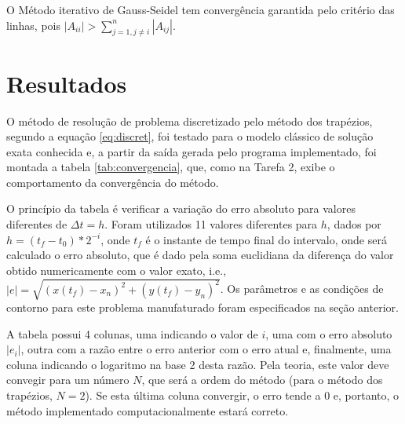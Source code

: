 \documentclass[a4paper,10pt]{article}
\begin{document}
  
  
  O Método iterativo de Gauss-Seidel tem convergência garantida pelo critério das linhas, pois $|A_{ii}| > \sum\limits_{j=1, j\not=i}^{n}|A_{ij}|$.

  \section{Resultados}
  O método de resolução de problema discretizado pelo método dos trapézios, segundo a equação \ref{eq:discret}, foi testado para o modelo clássico de solução exata conhecida e, a partir da saída gerada pelo programa implementado, foi montada a tabela \ref{tab:convergencia}, que, como na Tarefa 2, exibe o comportamento da convergência do método.
  
  O princípio da tabela é verificar a variação do erro absoluto para valores diferentes de $\Delta t = h$. Foram utilizados 11 valores diferentes para $h$, dados por $h = (t_{f} - t_{0}) * 2 ^ {- i}$, onde $t_{f}$ é o instante de tempo final do intervalo, onde será calculado o erro absoluto, que é dado pela soma euclidiana da diferença do valor obtido numericamente com o valor exato, i.e., $|e| = \sqrt{(x(t_{f}) - x_{n})^{2} + (y(t_{f}) - y_{n})^2}$. Os parâmetros e as condições de contorno para este problema manufaturado foram especificados na seção anterior.
  
  A tabela possui 4 colunas, uma indicando o valor de $i$, uma com o erro absoluto $|e_{i}|$, outra com a razão entre o erro anterior com o erro atual e, finalmente, uma coluna indicando o logaritmo na base 2 desta razão. Pela teoria, este valor deve convegir para um número $N$, que será a ordem do método (para o método dos trapézios, $N = 2$). Se esta última coluna convergir, o erro tende a 0 e, portanto, o método implementado computacionalmente estará correto.
\end{document}
